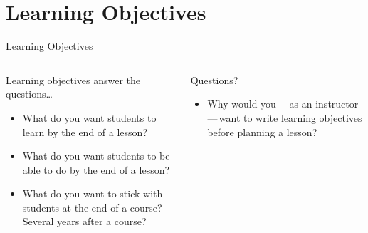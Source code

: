 \documentclass[10pt, aspectratio=169, t]{beamer}
\begin{document}
\section{Learning Objectives}
\begin{frame}{Learning Objectives}
\begin{columns}
\begin{column}{0.5\textwidth}
	\begin{block}{Learning objectives}
		answer the questions\ldots
		\begin{itemize}
			\item What do you want students to \alert{learn} by the end of a lesson?
			\item What do you want students to be able to \alert{do} by the end of a lesson?
			\item What do you want to \alert{stick} with students at the end of a course? Several years after a course?
		\end{itemize}
	\end{block}
\end{column}
\begin{column}{0.5\textwidth}  %
	\pause
	\begin{block}{Questions?}
		\large
		\begin{itemize}
			\item Why would you\,---\,as an instructor\,---\,want to write learning objectives before planning a lesson?
		\end{itemize}
	\end{block}
\end{column}
\end{columns}
\end{frame}
\end{document}
